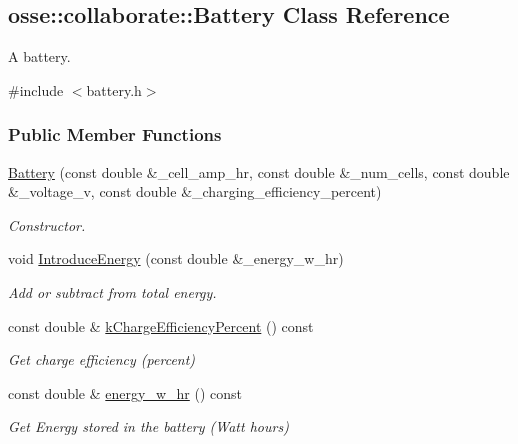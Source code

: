 \hypertarget{classosse_1_1collaborate_1_1_battery}{}\subsection{osse\+:\+:collaborate\+:\+:Battery Class Reference}
\label{classosse_1_1collaborate_1_1_battery}


A battery.  




{\ttfamily \#include $<$battery.\+h$>$}

\subsubsection*{Public Member Functions}
\begin{DoxyCompactItemize}
\item 
\hyperlink{classosse_1_1collaborate_1_1_battery_aa7cf9b637b12ead425d0643e325e3b85}{Battery} (const double \&\+\_\+cell\+\_\+amp\+\_\+hr, const double \&\+\_\+num\+\_\+cells, const double \&\+\_\+voltage\+\_\+v, const double \&\+\_\+charging\+\_\+efficiency\+\_\+percent)
\begin{DoxyCompactList}\small\item\em Constructor. \end{DoxyCompactList}\item 
void \hyperlink{classosse_1_1collaborate_1_1_battery_aaba13e6f12650d1503fccb96119f5871}{Introduce\+Energy} (const double \&\+\_\+energy\+\_\+w\+\_\+hr)
\begin{DoxyCompactList}\small\item\em Add or subtract from total energy. \end{DoxyCompactList}\item 
const double \& \hyperlink{classosse_1_1collaborate_1_1_battery_a98033b5ec818bc5d243b76f87713f8e1}{k\+Charge\+Efficiency\+Percent} () const
\begin{DoxyCompactList}\small\item\em Get charge efficiency (percent) \end{DoxyCompactList}\item 
const double \& \hyperlink{classosse_1_1collaborate_1_1_battery_ace47f7e90f5edd460e93438013104012}{energy\+\_\+w\+\_\+hr} () const
\begin{DoxyCompactList}\small\item\em Get Energy stored in the battery (Watt hours) \end{DoxyCompactList}\end{DoxyCompactItemize}
